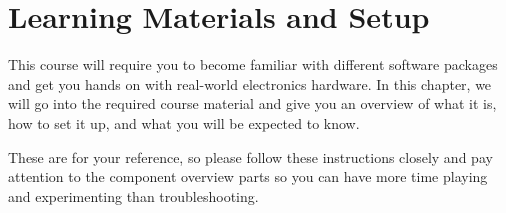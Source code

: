 %

\chapter*{Learning Materials and Setup}
\setchapterpreamble[u]{\margintoc}

This course will require you to become familiar with different software packages and get you hands on with real-world electronics hardware.
In this chapter, we will go into the required course material and give you an overview of what it is, how to set it up, and what you will be expected to know.

These are for your reference, so please follow these instructions closely and pay attention to the component overview parts so you can have more time playing and experimenting than troubleshooting.







